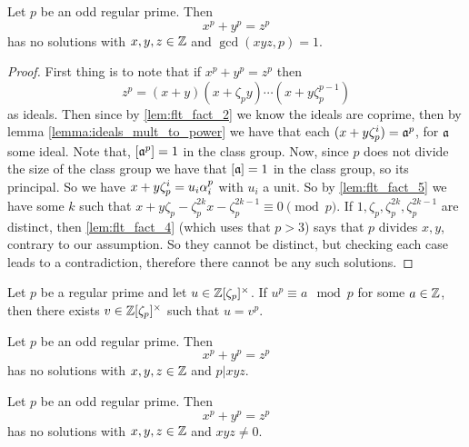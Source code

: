 \begin{theorem}\label{theorem:FLT_case_one}
	Let $p$ be an odd regular prime. Then \[x^p+y^p=z^p\] has no solutions with $x,y,z \in \mathbb{Z}$ and $\gcd(xyz,p)=1$.
\end{theorem}
\begin{proof}
	First thing is to note that if $x^p+y^p=z^p$ then \[z^p=(x+y)(x+\zeta_py)\cdots(x+y\zeta_p^{p-1})\] as ideals. Then since by \ref{lem:flt_fact_2} we know the ideals are coprime, then by lemma \ref{lemma:ideals_mult_to_power} we have that each $(x+y\zeta_p^i)=\mathfrak{a}^p$, for $\mathfrak{a}$ some ideal. Note that, $[\mathfrak{a}^p]=1$ in the class group. Now, since $p$ does not divide the size of the class group we have that $[\mathfrak{a}]=1$ in the class group, so its principal. So we have $x+y\zeta_p^i=u_i\alpha_i^p$ with $u_i$ a unit. So by \ref{lem:flt_fact_5} we have some $k$ such that $x+y\zeta_p-\zeta_p^{2k}x-\zeta_p^{2k-1} \equiv 0 \pmod p$. If $1,\zeta_p,\zeta_p^{2k},\zeta_p^{2k-1}$ are distinct, then \ref{lem:flt_fact_4} (which uses that $p>3$) says that $p$  divides $x,y$, contrary to our assumption. So they cannot be distinct, but checking each case leads to a contradiction, therefore there cannot be any such solutions.
\end{proof}

\begin{theorem}\label{thm:Kummers_lemma}
	Let $p$ be a regular prime and let $u \in \mathbb{Z}[\zeta_p]^\times$. If $u^p \equiv a \mod p$ for some $a \in \mathbb{Z}$, then there exists $v \in \mathbb{Z}[\zeta_p]^\times$ such that $u=v^p$.
\end{theorem}	

\begin{theorem}\label{theorem:FLT_case_two}
	Let $p$ be an odd regular prime. Then \[x^p+y^p=z^p\] has no solutions with $x,y,z \in \mathbb{Z}$ and $p | xyz$.
\end{theorem}


\begin{theorem}\label{FLT_regular}
	Let $p$ be an odd regular prime.  Then \[x^p+y^p=z^p\] has no solutions with $x,y,z \in \mathbb{Z}$ and $xyz \ne 0$.
\end{theorem}

